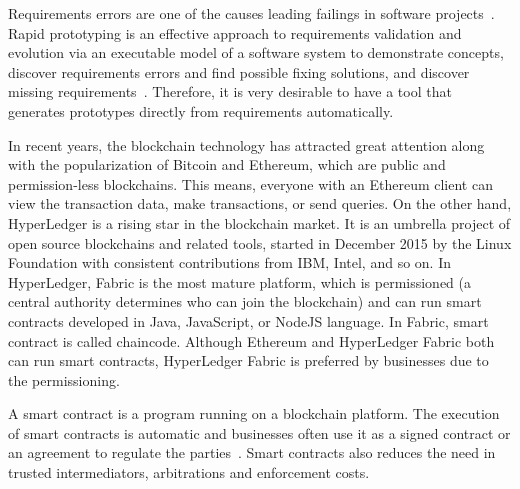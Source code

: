 Requirements errors are one of the causes leading failings in software projects~\cite{sutcliffe1999tracing}.
Rapid prototyping is an effective approach to requirements validation and evolution via an executable model of a software system to demonstrate concepts, discover requirements errors and find possible fixing solutions, and discover missing requirements~\cite{kordon2002introduction}.
Therefore, it is very desirable to have a tool that generates prototypes directly from requirements automatically.


In recent years, the blockchain technology has attracted great attention along with the popularization of Bitcoin and Ethereum,
which are public and permission-less blockchains.
This means, everyone with an Ethereum client can view the transaction data, make transactions, or send queries.
On the other hand, HyperLedger is a rising star in the blockchain market. It is an umbrella project of open source blockchains and related tools, started in December 2015 by the Linux Foundation with consistent contributions from IBM, Intel, and so on.
In HyperLedger, Fabric is the most mature platform, which is permissioned (a central authority determines who can join the blockchain) and can run smart contracts developed in Java, JavaScript, or NodeJS language. In Fabric, smart contract is called chaincode. Although Ethereum and HyperLedger Fabric both can run smart contracts, HyperLedger Fabric is preferred by businesses due to the permissioning.

A smart contract is a program running on a blockchain platform.
The execution of smart contracts is automatic and businesses often use it as a signed contract or an agreement to regulate the parties~\cite{savelyev2017contract}.
Smart contracts also reduces the need in trusted intermediators, arbitrations and enforcement costs.

